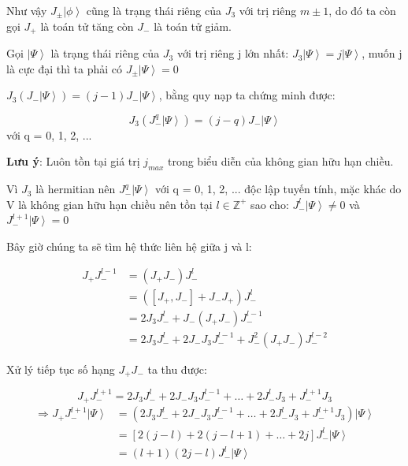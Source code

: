 \documentclass{report}
\begin{document}
Như vậy \( J_{\pm} \left| {\phi} \right\rangle \) cũng là trạng thái riêng của \( J_{3} \) với trị riêng \(  m \pm 1 \), do đó ta còn gọi \( J_{+} \) là toán tử tăng còn \( J_{-} \) là toán tử giảm.

Gọi \( \left| {\Psi} \right\rangle \) là trạng thái riêng của \( J_{3} \) với trị riêng j lớn nhất: \( J_{3} \left| {\Psi} \right\rangle = j \left| {\Psi} \right\rangle \), muốn j là cực đại thì ta phải có \( J_{\pm} \left| {\Psi} \right\rangle = 0 \)

\( J_{3}\left( J_{-} \left| {\Psi} \right\rangle \right) = (j -1) J_{-} \left| {\Psi} \right\rangle \), bằng quy nạp ta chứng minh được:

\[ J_{3} \left( J_{-}^{q} \left| {\Psi} \right\rangle \right) = \left( j - q \right) J_{-} \left| {\Psi} \right\rangle \]
với q = 0, 1, 2, ...

\textbf{Lưu ý}: Luôn tồn tại giá trị \( j_{max} \) trong biểu diễn của không gian hữu hạn chiều.

Vì \( J_{3} \) là hermitian nên \( J_{-}^{q} \left| {\Psi} \right\rangle \) với q = 0, 1, 2, ... độc lập tuyến tính, mặc khác do V là không gian hữu hạn chiều  nên tồn tại \( l \in \mathbb{Z}^{+} \) sao cho: \( J_{-}^{l} \left| {\Psi} \right\rangle \neq 0 \) và \( J_{-}^{l+1} \left| {\Psi} \right\rangle = 0 \)
 
Bây giờ chúng ta sẽ tìm hệ thức liên hệ giữa j và l:

	\begin{align*}
		J_{+} J_{-}^{l-1} & = \left( J_{+} J_{-} \right) J_{-}^{l} \\
		& = \left( \left[ J_{+}, J_{-} \right] + J_{-}J_{+} \right) J_{-}^{l} \\
		& = 2 J_{3} J_{-}^{l} + J_{-} \left( J_{+} J_{-} \right) J_{-}^{l-1} \\
		& = 2 J_{3} J_{-}^{l} + 2 J_{-} J_{3} J_{-}^{l-1} + J_{-}^{2} \left( J_{+} J_{-} \right) J_{-}^{l-2} 
	\end{align*}
	
Xử lý tiếp tục số hạng \( J_{+} J_{-} \) ta thu được:

	\[ J_{+}J_{-}^{l+1} = 2 J_{3} J_{-}^{l} + 2 J_{-} J_{3} J_{-}^{l-1} + \dots + 2 J_{-}^{l} J_{3} + J_{-}^{l+1} J_{3} \]
	\begin{align*}	
		\Rightarrow J_{+}J_{-}^{l+1}  \left| {\Psi} \right\rangle & = \left( 2 J_{3} J_{-}^{l}	+ 2 J_{-} J_{3} J_{-}^{l-1} + \dots + 2 J_{-}^{l} J_{3} + J_{-}^{l+1} J_{3} \right)  \left| {\Psi} \right\rangle \\
		& =  \left[ 2(j-l) + 2(j-l+1) + \dots + 2j \right] J_{-}^{l} \left| {\Psi} \right\rangle \\
		& = (l+1)(2j-l) J_{-}^{l} \left| {\Psi} \right\rangle
	\end{align*}
\end{document}
